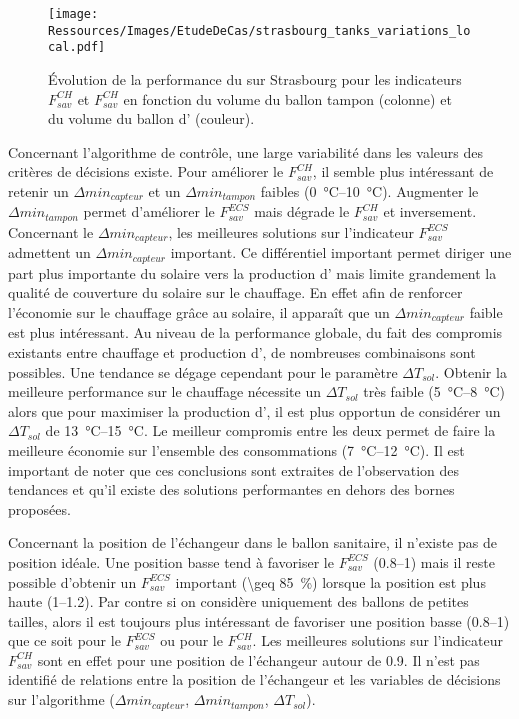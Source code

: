 \begin{figure}
    \centering
    \texttt{[image: Ressources/Images/EtudeDeCas/strasbourg\_tanks\_variations\_local.pdf]}
    \caption[Performance du  sur Strasbourg en fonction du volume des ballons]
             {Évolution de la performance du  sur Strasbourg pour les indicateurs $F_{sav}^{CH}$
              et $F_{sav}^{CH}$ en fonction du volume du ballon tampon (colonne) et
              du volume du ballon d’ (couleur).}
    \label{fig:tanks_variations_locales_strasbourg}
\end{figure}

Concernant l’algorithme de contrôle, une large variabilité dans les valeurs des critères de décisions existe.
Pour améliorer le $F_{sav}^{CH}$, il semble plus intéressant de retenir un $\Delta
min_{capteur}$ et un $\Delta min_{tampon}$ faibles (\SIrange{0}{10}{\celsius}). Augmenter
le $\Delta min_{tampon}$ permet d’améliorer le $F_{sav}^{ECS}$ mais dégrade le
$F_{sav}^{CH}$ et inversement. Concernant le $\Delta min_{capteur}$, les meilleures
solutions sur l’indicateur $F_{sav}^{ECS}$ admettent un $\Delta min_{capteur}$ important.
Ce différentiel important permet diriger une part plus importante du solaire vers la
production d’ mais limite grandement la qualité de couverture du solaire sur le
chauffage. En effet afin de renforcer l’économie sur le chauffage grâce au solaire, il
apparaît que un $\Delta min_{capteur}$ faible est plus intéressant. Au niveau de la
performance globale, du fait des compromis existants entre chauffage et production
d’, de nombreuses combinaisons sont possibles. Une tendance se dégage
cependant pour le paramètre $\Delta T_{sol}$.
Obtenir la meilleure performance sur le chauffage nécessite un $\Delta T_{sol}$
très faible (\SIrange{5}{8}{\celsius}) alors que pour maximiser la production
d’, il est plus opportun de considérer un $\Delta T_{sol}$ de
\SIrange{13}{15}{\celsius}. Le meilleur compromis entre les deux permet de faire la
meilleure économie sur l’ensemble des consommations (\SIrange{7}{12}{\celsius}).
Il est important de noter que ces conclusions sont extraites de l’observation des
tendances et qu’il existe des solutions performantes en dehors des bornes proposées.

Concernant la position de l’échangeur dans le ballon sanitaire, il n’existe pas de
position idéale. Une position basse tend à favoriser le $F_{sav}^{ECS}$ (\numrange{0.8}{1})
mais il reste possible d’obtenir un $F_{sav}^{ECS}$ important (\SI{\geq 85}{\percent})
lorsque la position est plus haute (\numrange{1}{1.2}). Par contre si on considère uniquement
des ballons de petites tailles, alors il est toujours plus intéressant de favoriser une
position basse (\numrange{0.8}{1}) que ce soit pour le $F_{sav}^{ECS}$ ou pour le $F_{sav}^{CH}$.
Les meilleures solutions sur l’indicateur $F_{sav}^{CH}$ sont en effet pour une position
de l’échangeur autour de \num{0.9}. Il n’est pas identifié de relations entre la position de l’échangeur
et les variables de décisions sur l’algorithme ($\Delta min_{capteur}$, $\Delta min_{tampon}$,
$\Delta T_{sol}$).


